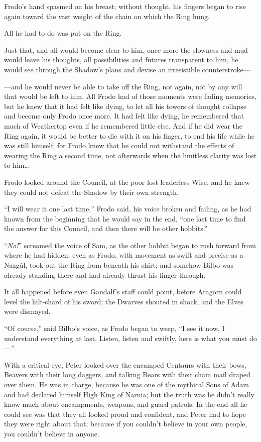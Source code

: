Frodo’s hand spasmed on his breast; without thought, his fingers began to rise again toward the vast weight of the chain on which the Ring hung.

All he had to do was put on the Ring.

Just that, and all would become clear to him, once more the slowness and mud would leave his thoughts, all possibilities and futures transparent to him, he would see through the Shadow’s plans and devise an irresistible counterstroke—

—and he would never be able to take off the Ring, not again, not by any will that would be left to him. All Frodo had of those moments were fading memories, but he knew that it had felt like dying, to let all his towers of thought collapse and become only Frodo once more. It had felt like dying, he remembered that much of Weathertop even if he remembered little else. And if he did wear the Ring again, it would be better to die with it on his finger, to end his life while he was still himself; for Frodo knew that he could not withstand the effects of wearing the Ring a second time, not afterwards when the limitless clarity was lost to him…

Frodo looked around the Council, at the poor lost leaderless Wise, and he knew they could not defeat the Shadow by their own strength.

“I will wear it one last time,” Frodo said, his voice broken and failing, as he had known from the beginning that he would say in the end, “one last time to find the answer for this Council, and then there will be other hobbits.”

“\emph{No!}” screamed the voice of Sam, as the other hobbit began to rush forward from where he had hidden; even as Frodo, with movement as swift and precise as a Nazgûl, took out the Ring from beneath his shirt; and somehow Bilbo was already standing there and had already thrust his finger through.

It all happened before even Gandalf’s staff could point, before Aragorn could level the hilt-shard of his sword; the Dwarves shouted in shock, and the Elves were dismayed.

“Of course,” said Bilbo’s voice, as Frodo began to weep, “I see it now, I understand everything at last. Listen, listen and swiftly, here is what you must do—”


With a critical eye, Peter looked over the encamped Centaurs with their bows, Beavers with their long daggers, and talking Bears with their chain mail draped over them. He was in charge, because he was one of the mythical Sons of Adam and had declared himself High King of Narnia; but the truth was he didn’t really know much about encampments, weapons, and guard patrols. In the end all he could see was that they all looked proud and confident, and Peter had to hope they were right about that; because if you couldn’t believe in your own people, you couldn’t believe in anyone.

